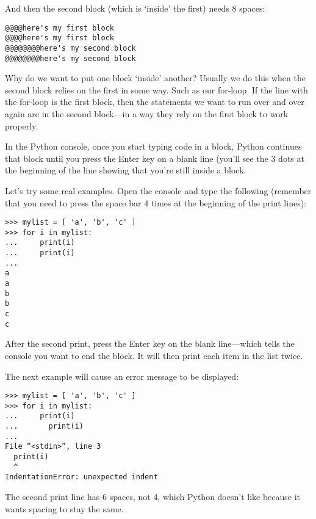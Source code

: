 And then the second block (which is `inside' the first) needs 8 spaces:

\begin{listing}
\begin{verbatim}
@@@@here's my first block
@@@@here's my first block
@@@@@@@@here's my second block
@@@@@@@@here's my second block
\end{verbatim}
\end{listing}

Why do we want to put one block `inside' another?  Usually we do this when the second block relies on the first in some way.  Such as our for-loop.  If the line with the for-loop is the first block, then the statements we want to run over and over again are in the second block---in a way they rely on the first block to work properly.

In the Python console, once you start typing code in a block, Python continues that block until you press the Enter key on a blank line (you'll see the 3 dots at the beginning of the line showing that you're still inside a block.

Let's try some real examples.  Open the console and type the following (remember that you need to press the space bar 4 times at the beginning of the print lines):

\begin{listing}
\begin{verbatim}
>>> mylist = [ 'a', 'b', 'c' ]
>>> for i in mylist:
...     print(i)
...     print(i)
...
a
a
b
b
c
c
\end{verbatim}
\end{listing}

After the second print, press the Enter key on the blank line---which tells the console you want to end the block. It will then print each item in the list twice.
\par
\noindent
The next example will cause an error message to be displayed:

\begin{listing}
\begin{verbatim}
>>> mylist = [ 'a', 'b', 'c' ]
>>> for i in mylist:
...     print(i)
...       print(i)
...
File “<stdin>”, line 3
  print(i)
  ^
IndentationError: unexpected indent
\end{verbatim}
\end{listing}

The second print line has 6 spaces, not 4, which Python doesn't like because it wants spacing to stay the same.

